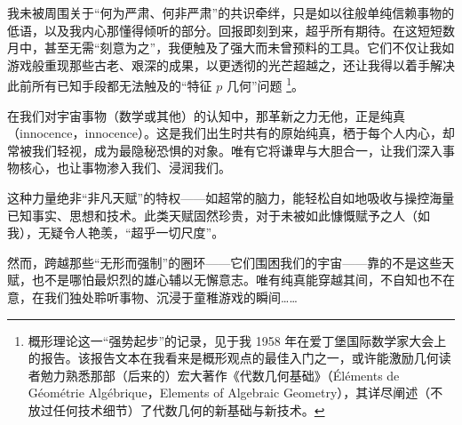 我未被周围关于“何为严肃、何非严肃”的共识牵绊，只是如以往般单纯信赖事物的低语，以及我内心那懂得倾听的部分。回报即刻到来，超乎所有期待。在这短短数月中，甚至无需“刻意为之”，我便触及了强大而未曾预料的工具。它们不仅让我如游戏般重现那些古老、艰深的成果，以更透彻的光芒超越之，还让我得以着手解决此前所有已知手段都无法触及的“特征 $p$ 几何”问题 \footnote{概形理论这一“强势起步”的记录，见于我 1958 年在爱丁堡国际数学家大会上的报告。该报告文本在我看来是概形观点的最佳入门之一，或许能激励几何读者勉力熟悉那部（后来的）宏大著作《代数几何基础》（Éléments de Géométrie Algébrique，Elements of Algebraic Geometry），其详尽阐述（不放过任何技术细节）了代数几何的新基础与新技术。}。

在我们对宇宙事物（数学或其他）的认知中，那革新之力无他，正是纯真（innocence，innocence）。这是我们出生时共有的原始纯真，栖于每个人内心，却常被我们轻视，成为最隐秘恐惧的对象。唯有它将谦卑与大胆合一，让我们深入事物核心，也让事物渗入我们、浸润我们。

这种力量绝非“非凡天赋”的特权——如超常的脑力，能轻松自如地吸收与操控海量已知事实、思想和技术。此类天赋固然珍贵，对于未被如此慷慨赋予之人（如我），无疑令人艳羡，“超乎一切尺度”。

然而，跨越那些“无形而强制”的圈环——它们围困我们的宇宙——靠的不是这些天赋，也不是哪怕最炽烈的雄心辅以无懈意志。唯有纯真能穿越其间，不自知也不在意，在我们独处聆听事物、沉浸于童稚游戏的瞬间……